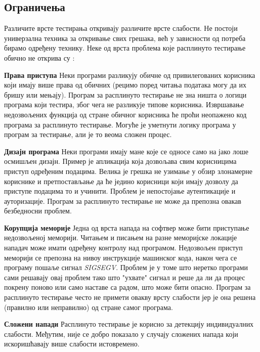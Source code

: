 \documentclass[12pt,oneside]{memoir}
\begin{document}
\subsection{Ограничења}
\label{subsec:ogranicenja}

Различите врсте тестирања откривају различите врсте слабости. Не постоји универзална техника за откривање свих грешака, већ у зависности од потреба бирамо одређену технику. Неке од врста проблема које расплинуто тестирање обично не открива су \cite{fuzzingBrute}:
\begin{description}
\item \textbf{Права приступа} Неки програми разликују обичне од привилегованих корисника који имају више права од обичних (рецимо поред читања података могу да их бришу или мењају). Програм за расплинуто тестирање не зна ништа о логици програма који тестира, због чега не разликује типове корисника. Извршавање недозвољених функција од стране обичног корисника ће проћи неопажено код програма за расплинуто тестирање. Могуће је уметнути логику програма у програм за тестирање, али је то веома сложен процес.  
\item \textbf{Дизајн програма} Неки програми имају мане које се односе само на јако лоше осмишљен дизајн. Пример је апликација која дозвољава свим корисницима приступ одређеним подацима. Велика је грешка не узимање у обзир злонамерне кориснике и претпостављање да ће једино корисници који имају дозволу да приступе подацима то и учинити. Проблем је непостојање аутентикације и ауторизације. Програм за расплинуто тестирање не може да препозна овакав безбедносни проблем.
\item \textbf{Корупција меморије} Једна од врста напада на софтвер може бити приступање недозвољеној меморији. Читањем и писањем на разне меморијске локације нападач може имати одређену контролу над програмом. Недозвољен приступ меморији се препозна на нивоу инструкције машинског кода, након чега се програму пошаље сигнал \textit{SIGSEGV}. Проблем је у томе што неретко програми сами решавају овај проблем тако што "ухвате" сигнал и реше да ли да процес покрену поново или само наставе са радом, што може бити опасно. Програм за расплинуто тестирање често не примети овакву врсту слабости јер је она решена (правилно или неправилно) од стране самог програма.
\item \textbf{Сложени напади} Расплинуто тестирање је корисно за детекцију индивидуалних слабости. Међутим, није се добро показало у случају сложених напада који искоришћавају више слабости истовремено.
\end{description}
\end{document}
